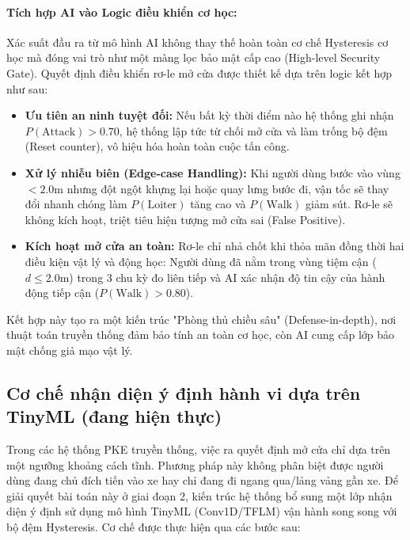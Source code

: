 \paragraph*{Tích hợp AI vào Logic điều khiển cơ học: }
Xác suất đầu ra từ mô hình AI không thay thế hoàn toàn cơ chế Hysteresis cơ học mà đóng vai trò như một màng lọc bảo mật cấp cao (High-level Security Gate). Quyết định điều khiển rơ-le mở cửa được thiết kế dựa trên logic kết hợp như sau:
\begin{itemize}
    \item \textbf{Ưu tiên an ninh tuyệt đối:} Nếu bất kỳ thời điểm nào hệ thống ghi nhận $P(\text{Attack}) > 0.70$, hệ thống lập tức từ chối mở cửa và làm trống bộ đệm (Reset counter), vô hiệu hóa hoàn toàn cuộc tấn công.
    \item \textbf{Xử lý nhiễu biên (Edge-case Handling):} Khi người dùng bước vào vùng $< 2.0$m nhưng đột ngột khựng lại hoặc quay lưng bước đi, vận tốc sẽ thay đổi nhanh chóng làm $P(\text{Loiter})$ tăng cao và $P(\text{Walk})$ giảm sút. Rơ-le sẽ không kích hoạt, triệt tiêu hiện tượng mở cửa sai (False Positive).
    \item \textbf{Kích hoạt mở cửa an toàn:} Rơ-le chỉ nhả chốt khi thỏa mãn đồng thời hai điều kiện vật lý và động học: Người dùng đã nằm trong vùng tiệm cận ($d \le 2.0$m) trong 3 chu kỳ đo liên tiếp và AI xác nhận độ tin cậy của hành động tiếp cận ($P(\text{Walk}) > 0.80$).
\end{itemize}

Kết hợp này tạo ra một kiến trúc "Phòng thủ chiều sâu" (Defense-in-depth), nơi thuật toán truyền thống đảm bảo tính an toàn cơ học, còn AI cung cấp lớp bảo mật chống giả mạo vật lý.
\fi

\subsection{Cơ chế nhận diện ý định hành vi dựa trên TinyML (đang hiện thực)}

Trong các hệ thống PKE truyền thống, việc ra quyết định mở cửa chỉ dựa trên một ngưỡng khoảng cách tĩnh. Phương pháp này không phân biệt được người dùng đang chủ đích tiến vào xe hay chỉ đang đi ngang qua/lảng vảng gần xe. Để giải quyết bài toán này ở giai đoạn 2, kiến trúc hệ thống bổ sung một lớp nhận diện ý định sử dụng mô hình TinyML (Conv1D/TFLM) vận hành song song với bộ đệm Hysteresis. Cơ chế được thực hiện qua các bước sau:

